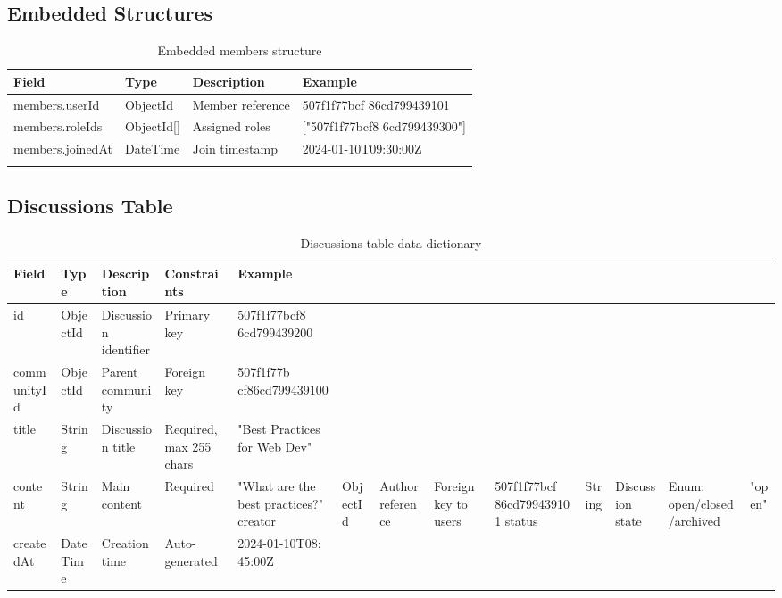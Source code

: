 \subsection{Embedded Structures}

\begin{longtable}{|C{3.5cm}|C{2cm}|C{4cm}|C{3cm}|}
\hline
\textbf{Field} & \textbf{Type} & \textbf{Description} & \textbf{Example} \\ \hline
\endhead

members.userId & ObjectId & Member reference & 507f1f77bcf 86cd799439101 \\ \hline
members.roleIds & ObjectId[] & Assigned roles & ["507f1f77bcf8 6cd799439300"] \\ \hline
members.joinedAt & DateTime & Join timestamp & 2024-01-10T09:30:00Z \\ \hline

\caption{Embedded members structure}
\label{tab:members_struct}
\end{longtable}

\subsection{Discussions Table}
\begin{longtable}{|L{3cm}|C{2cm}|L{2.5cm}|L{3cm}|L{3cm}|}
\hline
\textbf{Field} & \textbf{Type} & \textbf{Description} & \textbf{Constraints} & \textbf{Example} \\ \hline
\endhead

id & ObjectId & Discussion identifier & Primary key & 507f1f77bcf8 6cd799439200 \\ \hline
communityId & ObjectId & Parent community & Foreign key & 507f1f77b cf86cd799439100 \\ \hline
title & String & Discussion title & Required, max 255 chars & "Best Practices for Web Dev" \\ \hline
content & String & Main content & Required & "What are the best practices?"  \hline
creator & ObjectId & Author reference & Foreign key to users & 507f1f77bcf 86cd799439101 \hline
status & String & Discussion state & Enum: open/closed/archived & "open" \\ \hline
createdAt & DateTime & Creation time & Auto-generated & 2024-01-10T08: 45:00Z \hline
\caption{Discussions table data dictionary}
\label{tab:discussions_dict}
\end{longtable}

